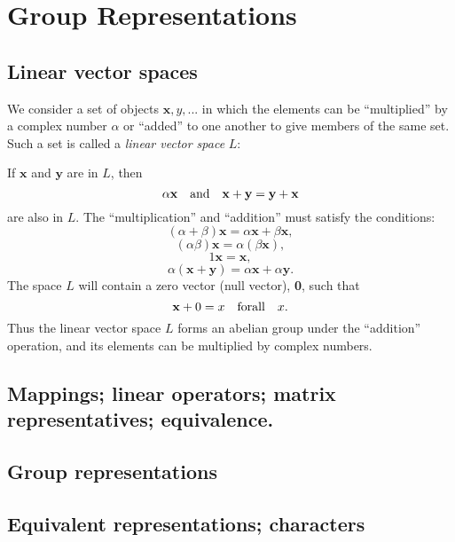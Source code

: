 \documentclass{book}
\begin{document}
\chapter{Group Representations}

\section{Linear vector spaces}

\def\bx{\mathbf x}
\def\by{\mathbf y}

We consider a set of objects ${\mathbf x,y,...}$ in which the elements
can be ``multiplied'' by a complex number $\alpha$ or ``added'' to one
another to give members of the same set. Such a set is called a {\it
  linear vector space} $L$:

If $\bx$ and $\by$ are in $L$, then
$$
\alpha{\mathbf x} \quad {\rm and} \quad {\bx+\by = \by+\bx}
$$
are also in $L$. The ``multiplication'' and ``addition'' must satisfy the conditions:
$$(\alpha + \beta)\bx = \alpha\bx + \beta\bx,$$
$$(\alpha\beta)\bx = \alpha(\beta\bx),$$
$$1\bx = \bx,$$
$$\alpha(\bx+\by) = \alpha\bx + \alpha\by.$$
The space $L$ will contain a zero vector (null vector), {\bf 0}, such that
$$\mathbf x + 0 = x \quad {\rm for all} \quad x.$$
Thus the linear vector space $L$ forms an abelian group under the
``addition'' operation, and its elements can be multiplied by complex numbers.

\section{}
\section{}
\section{Mappings; linear operators; matrix representatives; equivalence.}
\section{Group representations}
\section{Equivalent representations; characters}
\end{document}
